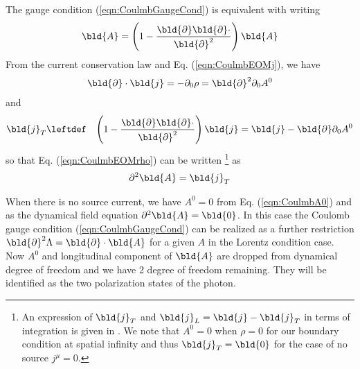 The gauge condition (\ref{eqn:CoulmbGaugeCond}) is
equivalent with writing
\begin{eqnarray}
\bld{A} =
\left(
1
-
\frac{\bld{\partial} \bld{\partial} \cdot}
{\bld{\partial}^2}
\right)
\bld{A}
\label{eqn:CoulmbProjection}
\end{eqnarray}
From the current conservation law 
and Eq. (\ref{eqn:CoulmbEOMj}), we have
\begin{eqnarray}
\bld{\partial}\cdot \bld{j}
= -\partial_0 \rho
= \bld{\partial}^2 \partial_0 A^0
\end{eqnarray}
and
\begin{eqnarray}
\bld{j}_T
&\leftdef&
\left(
1 -
\frac{\bld{\partial} \bld{\partial} \cdot}
{\bld{\partial}^2}
\right)
\bld{j}
=
\bld{j} -
\bld{\partial} \partial_0 A^0
\end{eqnarray}
so that Eq. (\ref{eqn:CoulmbEOMrho}) can be written
\footnote{%
An expression of $\bld{j}_T$ and $\bld{j}_L = \bld{j} -\bld{j}_T$ in terms of integration is given in
\cite{ref:Jackson}.
We note that $A^0 = 0$ when $\rho = 0$ for our boundary condition at spatial infinity and
thus $\bld{j}_T = \bld{0}$ for the case of no source $j^\mu = 0$.
}%
 as
\begin{eqnarray}
\partial^2 \bld{A}
=
\bld{j}_T
\end{eqnarray}

When there is no source current, we have $A^0 = 0$ from Eq. (\ref{eqn:CoulmbA0}) and
as the dynamical field equation $\partial^2 \bld{A}  = \bld{0}$.
In this case the Coulomb gauge condition (\ref{eqn:CoulmbGaugeCond}) can be
realized as a further restriction $\bld{\partial}^2 \Lambda = \bld{\partial} \cdot \bld{A}$ for a
given $A$ in the Lorentz condition case.
Now $A^0$ and longitudinal component of $\bld{A}$ are dropped from dynamical degree of
freedom and we have 2 degree of freedom remaining. They will be identified as the two
polarization states of the photon.

